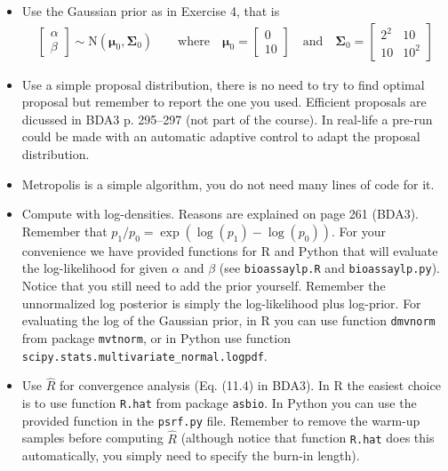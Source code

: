 \documentclass[a4paper,11pt]{article}
\newcommand{\vc}[1] { \mathbf{#1} }
\newcommand{\vs}[1] { \boldsymbol{#1} }
\begin{document}
\begin{itemize}
\item Use the Gaussian prior as in Exercise 4, that is %
\begin{align*}
	\begin{bmatrix}
	\alpha \\ \beta
	\end{bmatrix}
	\sim
	\text{N} \left(\vs \mu_0, \vc \Sigma_0 \right) \qquad
	\text{where} \quad
	\vs \mu_0 = \begin{bmatrix} 0 \\ 10 \end{bmatrix} \quad \text{and} \quad
	\vc \Sigma_0 = \begin{bmatrix} 2^2 & 10 \\ 10 & 10^2 \end{bmatrix}
\end{align*}
\item Use a simple proposal distribution, there is no need to try to find optimal proposal but remember to report the one you used. Efficient proposals are dicussed in BDA3 p. 295--297 (not part of the course). In real-life a pre-run could be made with an automatic adaptive control to adapt the proposal distribution.
\item Metropolis is a simple algorithm, you do not need many lines of code for it. 
\item Compute with log-densities. Reasons are explained on page 261 (BDA3). Remember that $p_1/p_0=\exp(\log(p_1)-\log(p_0))$. For your convenience we have provided functions for R and Python that will evaluate the log-likelihood for given $\alpha$ and $\beta$ (see {\tt bioassaylp.R} and {\tt bioassaylp.py}). Notice that you still need to add the prior yourself. Remember the unnormalized log posterior is simply the log-likelihood plus log-prior. For evaluating the log of the Gaussian prior, in R you can use function {\tt dmvnorm} from package {\tt mvtnorm}, or in Python use function {\tt scipy.stats.multivariate\_normal.logpdf}.
\item Use $\hat{R}$ for convergence analysis (Eq. (11.4) in BDA3). In R the easiest choice is to use function {\tt R.hat} from package {\tt asbio}. In Python you can use the provided function in the {\tt psrf.py} file. Remember to remove the warm-up samples before computing $\hat R$ (although notice that function {\tt R.hat} does this automatically, you simply need to specify the burn-in length). 


\end{itemize}
\end{document}

